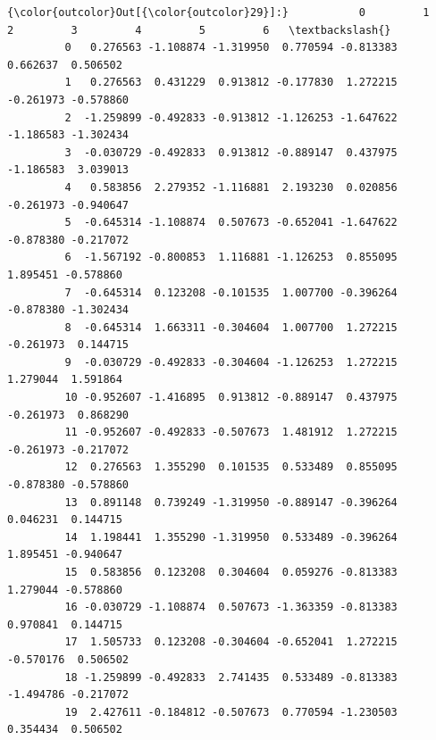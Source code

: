 \documentclass[11pt]{article}
\begin{document}
\begin{Verbatim}[commandchars=\\\{\}]
{\color{outcolor}Out[{\color{outcolor}29}]:}           0         1         2         3         4         5         6   \textbackslash{}
         0   0.276563 -1.108874 -1.319950  0.770594 -0.813383  0.662637  0.506502   
         1   0.276563  0.431229  0.913812 -0.177830  1.272215 -0.261973 -0.578860   
         2  -1.259899 -0.492833 -0.913812 -1.126253 -1.647622 -1.186583 -1.302434   
         3  -0.030729 -0.492833  0.913812 -0.889147  0.437975 -1.186583  3.039013   
         4   0.583856  2.279352 -1.116881  2.193230  0.020856 -0.261973 -0.940647   
         5  -0.645314 -1.108874  0.507673 -0.652041 -1.647622 -0.878380 -0.217072   
         6  -1.567192 -0.800853  1.116881 -1.126253  0.855095  1.895451 -0.578860   
         7  -0.645314  0.123208 -0.101535  1.007700 -0.396264 -0.878380 -1.302434   
         8  -0.645314  1.663311 -0.304604  1.007700  1.272215 -0.261973  0.144715   
         9  -0.030729 -0.492833 -0.304604 -1.126253  1.272215  1.279044  1.591864   
         10 -0.952607 -1.416895  0.913812 -0.889147  0.437975 -0.261973  0.868290   
         11 -0.952607 -0.492833 -0.507673  1.481912  1.272215 -0.261973 -0.217072   
         12  0.276563  1.355290  0.101535  0.533489  0.855095 -0.878380 -0.578860   
         13  0.891148  0.739249 -1.319950 -0.889147 -0.396264  0.046231  0.144715   
         14  1.198441  1.355290 -1.319950  0.533489 -0.396264  1.895451 -0.940647   
         15  0.583856  0.123208  0.304604  0.059276 -0.813383  1.279044 -0.578860   
         16 -0.030729 -1.108874  0.507673 -1.363359 -0.813383  0.970841  0.144715   
         17  1.505733  0.123208 -0.304604 -0.652041  1.272215 -0.570176  0.506502   
         18 -1.259899 -0.492833  2.741435  0.533489 -0.813383 -1.494786 -0.217072   
         19  2.427611 -0.184812 -0.507673  0.770594 -1.230503  0.354434  0.506502   
         

\end{Verbatim}
\end{document}
